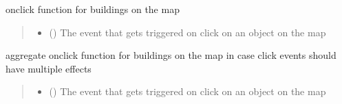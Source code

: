 \documentclass[letterpaper,10pt,english]{sphinxmanual}
\begin{document}

\begin{fulllineitems}
\label{\detokenize{docs_gui/js_api/postcode_editor/display_postcode:zoomToBuildingFeature}}
\pysigstartsignatures
{}
\pysigstopsignatures
\sphinxAtStartPar
onclick function for buildings on the map
\begin{quote}\begin{description}
\begin{itemize}
\item {} 
\sphinxAtStartPar
{} () \textendash{} The event that gets triggered on click on an object on the map

\end{itemize}

\end{description}\end{quote}

\end{fulllineitems}


\begin{fulllineitems}
\label{\detokenize{docs_gui/js_api/postcode_editor/display_postcode:displayBuildingEditOptions}}
\pysigstartsignatures
{}
\pysigstopsignatures
\sphinxAtStartPar
aggregate onclick function for buildings on the map in case click events should have multiple effects
\begin{quote}\begin{description}
\begin{itemize}
\item {} 
\sphinxAtStartPar
{} () \textendash{} The event that gets triggered on click on an object on the map

\end{itemize}

\end{description}\end{quote}

\end{fulllineitems}
\end{document}
